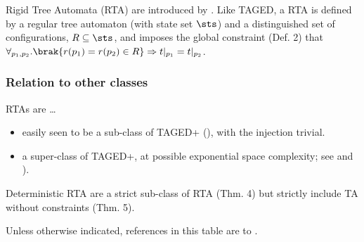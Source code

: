 Rigid Tree Automata (RTA) are introduced by \cite{jacquemard:rta}.  Like
TAGED, a RTA is defined by a regular tree automaton (with state set $\sts$)
and a distinguished set of configurations, $R \subseteq \sts$, and
imposes the global constraint (Def. 2) that $\forall_{p_1,p_2} . \brak{
r(p_1) = r(p_2) \in R } \Rightarrow t\vert_{p_1} = t\vert_{p_2}$.

\subsubsection{Relation to other classes}

RTAs are \dots
%
\begin{itemize}
%
  \item easily seen to be a sub-class of TAGED+ (\cite[Sec.
3.1]{jacquemard:rta}), with the injection trivial.
%
  \item a super-class of TAGED+, at possible exponential space complexity;
see \cite[Prop. 2]{jacquemard:rta} and \cite{filiot:tagc}).
%
\end{itemize}


Deterministic RTA are a strict sub-class of RTA (Thm. 4) but strictly
include TA without constraints (Thm. 5).

Unless otherwise indicated, references in this table are to
\cite{jacquemard:rta}.
